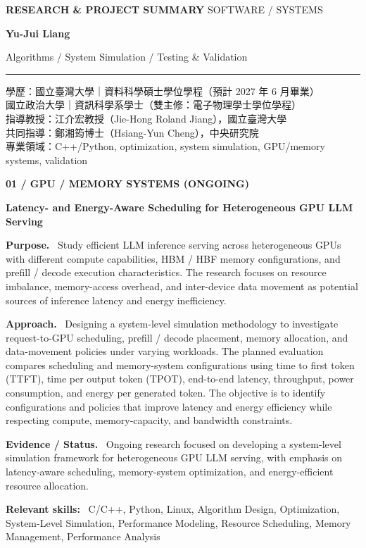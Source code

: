 \documentclass[a4paper,11pt]{article}
\newcommand{\dochead}[2]{%
  {\footnotesize\bfseries\color{muted} RESEARCH \& PROJECT SUMMARY}%
  \hfill{\footnotesize\color{muted} #1}\par\vspace{4pt}
  {\fontsize{20}{23}\selectfont\bfseries Yu-Jui Liang\hspace{0.4em}{\fontsize{17}{20}\selectfont 梁栯睿}}\par\vspace{3pt}
  {\small\color{muted}#2}\par\vspace{7pt}
  \color{rulecol}\rule{\linewidth}{1.1pt}\color{ink}\vspace{10pt}}
\newcommand{\metadata}[1]{{\small #1}\par\vspace{10pt}}
\newcommand{\project}[6]{%
{\small\color{muted}\bfseries #1}\par\vspace{3pt}
{\fontsize{12}{14}\selectfont\bfseries #2}\par\vspace{8pt}
{\small\textbf{Purpose.}\ #3}\par\vspace{6pt}
{\small\textbf{Approach.}\ #4}\par\vspace{6pt}
{\small\textbf{Evidence / Status.}\ #5}\par\vspace{6pt}
{\footnotesize\textbf{Relevant skills:}\ #6}\par\vspace{10pt}}
\begin{document}
\dochead{SOFTWARE / SYSTEMS}{Algorithms \quad / \quad System Simulation \quad / \quad Testing \& Validation}
\metadata{%
學歷：國立臺灣大學｜資料科學碩士學位學程（預計 2027 年 6 月畢業）\\[3pt]
\phantom{學歷：}國立政治大學｜資訊科學系學士（雙主修：電子物理學士學位學程）\\[3pt]
指導教授：江介宏教授（Jie-Hong Roland Jiang），國立臺灣大學\\[3pt]
共同指導：鄭湘筠博士（Hsiang-Yun Cheng），中央研究院\\[3pt]
專業領域：C++/Python, optimization, system simulation, GPU/memory systems, validation}

\project
{01 \quad / \quad GPU / MEMORY SYSTEMS (ONGOING)}
{Latency- and Energy-Aware Scheduling for Heterogeneous GPU LLM Serving}
{
Study efficient LLM inference serving across heterogeneous GPUs
with different compute capabilities, HBM / HBF memory configurations,
and prefill / decode execution characteristics.
The research focuses on resource imbalance, memory-access overhead,
and inter-device data movement as potential sources of inference
latency and energy inefficiency.
}
{
Designing a system-level simulation methodology to investigate
request-to-GPU scheduling, prefill / decode placement, memory
allocation, and data-movement policies under varying workloads.
The planned evaluation compares scheduling and memory-system
configurations using time to first token (TTFT), time per output
token (TPOT), end-to-end latency, throughput, power consumption,
and energy per generated token.
The objective is to identify configurations and policies that
improve latency and energy efficiency while respecting compute,
memory-capacity, and bandwidth constraints.
}
{
Ongoing research focused on developing a system-level
simulation framework for heterogeneous GPU LLM serving,
with emphasis on latency-aware scheduling, memory-system
optimization, and energy-efficient resource allocation.
}
{
C/C++, Python, Linux, Algorithm Design,
Optimization, System-Level Simulation,
Performance Modeling, Resource Scheduling,
Memory Management, Performance Analysis
}
\end{document}
